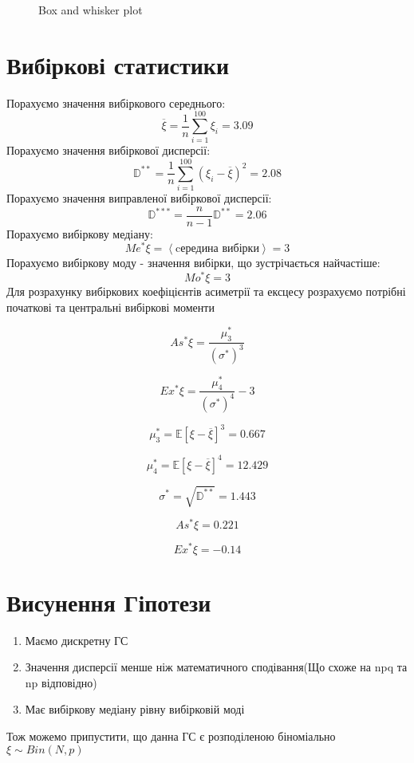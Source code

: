 \documentclass{article}
\begin{document}
\begin{figure}[H]
    \centering
    \caption{Box and whisker plot}
    
\end{figure}
\newpage
\section{Вибіркові статистики}
Порахуємо значення вибіркового середнього:
$$\overline{\xi}=\frac{1}{n}\sum_{i=1}^{100} \xi_i = 3.09$$
Порахуємо значення вибіркової дисперсії:
$$\mathbb{D}^{**}=\frac{1}{n} \sum_{i=1}^{100} (\xi_i - \overline{\xi})^2 = 2.08$$
Порахуємо значення виправленої вибіркової дисперсії:
$$\mathbb{D}^{***}=\frac{n}{n-1}\mathbb{D}^{**} = 2.06$$
Порахуємо вибіркову медіану:
$$Me^*\xi = \left<\text{cередина вибірки}\right> = 3$$
Порахуємо вибіркову моду - значення вибірки, що зустрічається найчастіше: 
$$Mo^*\xi = 3$$
Для розрахунку вибіркових коефіцієнтів асиметрії та ексцесу розрахуємо потрібні початкові та
центральні вибіркові моменти

$$As^* \xi = \frac{\mu_3^*}{({\sigma^*})^3}$$

$$Ex^* \xi = \frac{\mu_4^*}{({\sigma^*})^4} - 3$$

$$\mu_3^* = \mathbb{E}\left[ \xi - \overline{\xi}\right]^3 = 0.667$$

$$\mu_4^* = \mathbb{E}\left[ \xi - \overline{\xi}\right]^4 = 12.429$$

$$\sigma^* = \sqrt{\mathbb{D}^{**}} = 1.443$$

$$As^*\xi = 0.221$$

$$Ex^*\xi = -0.14$$

\newpage
\section{Висунення Гіпотези}
\begin{enumerate}
    \item Маємо дискретну ГС
    \item Значення дисперсії менше ніж математичного сподівання(Що схоже на npq та np відповідно)
    \item Має вибіркову медіану рівну вибірковій моді
\end{enumerate}
Тож можемо припустити, що данна ГС є розподіленою біноміально \\ $\xi \sim Bin(N, p)$
\newpage
\end{document}
